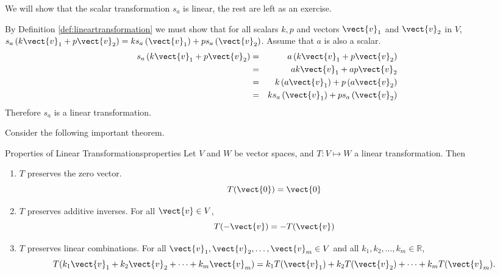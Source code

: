 \begin{solution}
We will show that the scalar transformation $s_a$ is linear, the rest are left as an exercise. 

By Definition \ref{def:lineartransformation} we must show that for all scalars $k ,p $ and 
vectors $\vect{v}_1$ and $\vect{v}_2$ in $V$, $s_a\left( k \vect{v}_1 + p \vect{v}_2 \right) = k s_a\left(\vect{v}_1\right)+ p s_a\left(\vect{v}_{2} \right)$. Assume that $a$ is also a scalar. 
\begin{eqnarray*}
s_a\left( k \vect{v}_1 + p \vect{v}_2 \right) &=& a \left( k \vect{v}_1 + p \vect{v}_2 \right) \\
&=&  ak \vect{v}_1 + ap \vect{v}_2  \\
 &=&  k \left(a \vect{v}_1\right) + p\left(a \vect{v}_2\right)  \\
&=& k s_a\left( \vect{v}_1 \right)  + p s_a \left(\vect{v}_2 \right)
\end{eqnarray*}
Therefore $s_a$ is a linear transformation.
\end{solution}

Consider the following important theorem.

\begin{theorem}{Properties of Linear Transformations}{properties}
Let $V$ and $W$ be vector spaces, and $T:V \mapsto W$ a linear
transformation. 
Then
\begin{enumerate}
\item $T$ preserves the zero vector.
\[
T(\vect{0})=\vect{0}
\]
\item $T$ preserves additive inverses. 
For all $\vect{v}\in V$, 
\[
T(-\vect{v})= -T(\vect{v})
\]
\item $T$ preserves linear combinations.
For all $\vect{v}_1, \vect{v}_2, \ldots, \vect{v}_m \in V$ and
all $k_1, k_2, \ldots, k_m\in\mathbb{R}$,
\[ T(k_1\vect{v}_1 + k_2\vect{v}_2 + \cdots + k_m\vect{v}_m)
= k_1T(\vect{v}_1) + k_2T(\vect{v}_2) + \cdots + k_mT(\vect{v}_m).\]
\end{enumerate}
\end{theorem}

